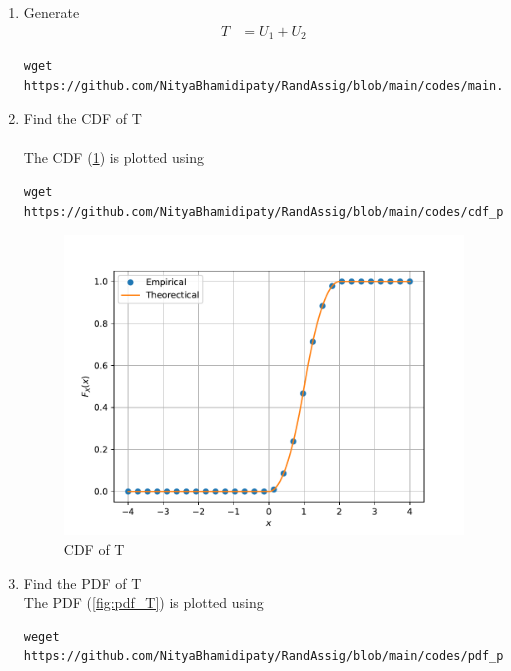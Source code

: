 \documentclass[journal,12pt,twocolumn]{IEEEtran}
\renewcommand\thesection{\arabic{section}}
\begin{document}
\begin{enumerate}[label=\thesection.\arabic*
    ,ref=\thesection.\theenumi]
\item Generate 
\begin{align}
    T &= U_1 + U_2
\end{align}
\solution
\begin{lstlisting}
wget https://github.com/NityaBhamidipaty/RandAssig/blob/main/codes/main.c
\end{lstlisting}
\item Find the CDF of T\\
\solution\\
The CDF (\ref{fig:cdf_T}) is plotted using 
\begin{lstlisting}
wget https://github.com/NityaBhamidipaty/RandAssig/blob/main/codes/cdf_plot.py
\end{lstlisting}
\begin{figure}
    \centering
    \includegraphics[width=\columnwidth]{./figs/tri_cdf.pdf}
    \caption{CDF of T}
    \label{fig:cdf_T}
\end{figure}
\item Find the PDF of T\\
\solution
The PDF (\ref{fig:pdf_T}) is plotted using
\begin{lstlisting}
weget https://github.com/NityaBhamidipaty/RandAssig/blob/main/codes/pdf_plot.py
\end{lstlisting}
\begin{figure}
    \centering

\end{figure}
\end{enumerate}
\end{document}
